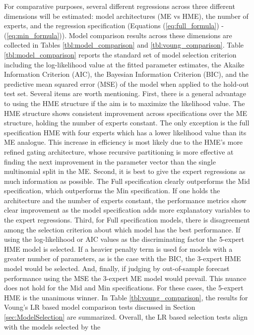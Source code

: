 \documentclass[12pt]{article}
\theoremstyle{definition}
\begin{document}
For comparative purposes, several different regressions across three
different dimensions will be estimated: model architectures (ME vs HME), the number of experts,
and the regression specification (Equations (\ref{eq:full_formula}) -
(\ref{eq:min_formula})). Model comparison results across these dimensions
are collected in Tables \ref{tbl:model_comparison} and \ref{tbl:voung_comparison}.
Table \ref{tbl:model_comparison} reports the standard set of model selection criterion
including the log-likelihood value at the fitted parameter estimates, the Akaike
Information Criterion (AIC), the Bayesian Information Criterion (BIC), and the
predictive mean squared error (MSE) of the model when applied to the hold-out test set.
Several items are worth mentioning. First, there is a general advantage
to using the HME structure if the aim is to maximize the
likelihood value. The HME structure shows consistent improvement
across specifications over the ME structure, holding the number of experts
constant. The only exception is the full specification HME with four experts which
has a lower likelihood value than its ME analogue. This increase in efficiency
is most likely due to the HME's more refined gating architecture, whose recursive
partitioning is more effective at finding the next improvement in the parameter
vector than the single multinomial split in the ME. Second, it is best to give the expert
regressions as much information as possible. The Full specification clearly outperforms
the Mid specification, which outperforms the Min specification. If one holds the
architecture and the number of experts constant, the performance metrics show clear
improvement as the model specification adds more explanatory variables to the expert
regressions. Third, for Full specification models, there is
disagreement among the selection criterion about which model has the best performance.
If using the log-likelihood or AIC values as the discriminating factor the 5-expert HME
model is selected. If a heavier penalty term is used for models with a greater number
of parameters, as is the case with the BIC, the 3-expert HME model would be selected.
And, finally, if judging by out-of-sample forecast performance using the MSE the 3-expert
ME model would prevail. This nuance does not hold for the Mid and Min specifications.
For these cases, the 5-expert HME is the unanimous winner. In Table \ref{tbl:voung_comparison},
the results for Voung's LR based model comparison tests discussed in Section \ref{sec:ModelSelection}
are summarized. Overall, the LR based selection tests align with the models selected by the
\end{document}

